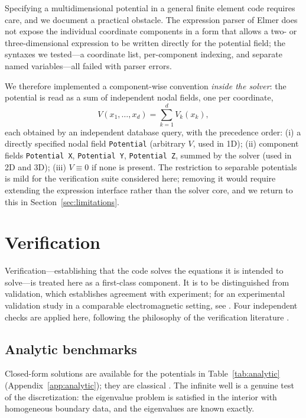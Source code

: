 \documentclass[pdflatex,sn-mathphys-num]{sn-jnl}
\theoremstyle{thmstyleone}%
\theoremstyle{thmstyletwo}%
\theoremstyle{thmstylethree}%
\begin{document}
Specifying a multidimensional potential in a general finite element code
requires care, and we document a practical obstacle. The expression parser of
\textsf{Elmer} does not expose the individual coordinate components in a form
that allows a two- or three-dimensional expression to be written directly for
the potential field; the syntaxes we tested---a coordinate list, per-component
indexing, and separate named variables---all failed with parser errors.

We therefore implemented a component-wise convention \emph{inside the solver}:
the potential is read as a sum of independent nodal fields, one per coordinate,
%
\begin{equation}
  V(x_1,\dots,x_d) = \sum_{k=1}^{d} V_k(x_k),
\end{equation}
%
each obtained by an independent database query, with the precedence order:
(i) a directly specified nodal field \texttt{Potential} (arbitrary $V$, used in
1D); (ii) component fields \texttt{Potential X}, \texttt{Potential Y},
\texttt{Potential Z}, summed by the solver (used in 2D and 3D); (iii)
$V \equiv 0$ if none is present. The restriction to separable potentials is mild
for the verification suite considered here; removing it would require extending
the expression interface rather than the solver core, and we return to this in
Section~\ref{sec:limitations}.

\section{Verification}\label{sec:verification}

Verification---establishing that the code solves the equations it is intended to
solve---is treated here as a first-class component. It is to be distinguished
from validation, which establishes agreement with experiment; for an
experimental validation study in a comparable electromagnetic setting, see
\cite{tabora2022}. Four independent checks are applied here, following the
philosophy of the verification literature \cite{oberkampf2010,roache1998}.

\subsection{Analytic benchmarks}

Closed-form solutions are available for the potentials in
Table~\ref{tab:analytic} (Appendix~\ref{app:analytic}); they are classical
\cite{courant1953,harrison2005}. The infinite well is a
genuine test of the discretization: the eigenvalue problem is satisfied in the
interior with homogeneous boundary data, and the eigenvalues are known exactly.
\end{document}
